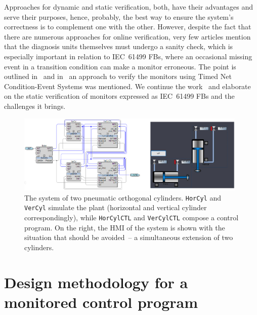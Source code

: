 \begin{bibunit}
Approaches for dynamic and static verification, both, have their advantages and serve their purposes, hence, probably, the best way to ensure the system's correctness is to complement one with the other. However, despite the fact that there are numerous approaches for online verification, very few articles mention that the diagnosis units themselves must undergo a sanity check, which is especially important in relation to IEC~61499 FBs, where an occasional missing event in a transition condition can make a monitor erroneous. The point is outlined in~\cite{9wiesmayr2022supporting} and in~\cite{17jhunjhunwala2022monitoring} an approach to verify the monitors using Timed Net Condition-Event Systems was mentioned. We continue the work~\cite{17jhunjhunwala2022monitoring} and elaborate on the static verification of monitors expressed as IEC~61499 FBs and the challenges it brings. 

\begin{figure}[htb]
    \centering
    \includegraphics[width=0.98\textwidth]{MX_Papers/Paper3/pic/wholesystem_withhmi.png}
    \caption{The system of two pneumatic orthogonal cylinders. \texttt{HorCyl} and \texttt{VerCyl} simulate the plant (horizontal and vertical cylinder correspondingly), while \texttt{HorCylCTL} and \texttt{VerCylCTL} compose a control program. On the right, the HMI of the system is shown with the situation that should be avoided~-- a simultaneous extension of two cylinders.}
    \label{system}
\end{figure}

\section{Design methodology for a monitored control program}
\label{sec:method}


\end{bibunit}
